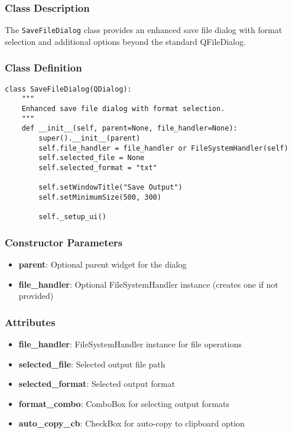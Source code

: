 \subsubsection{Class Description}

The \texttt{SaveFileDialog} class provides an enhanced save file dialog with format selection and additional options beyond the standard QFileDialog.

\subsubsection{Class Definition}

\begin{verbatim}
class SaveFileDialog(QDialog):
    """
    Enhanced save file dialog with format selection.
    """
    def __init__(self, parent=None, file_handler=None):
        super().__init__(parent)
        self.file_handler = file_handler or FileSystemHandler(self)
        self.selected_file = None
        self.selected_format = "txt"
        
        self.setWindowTitle("Save Output")
        self.setMinimumSize(500, 300)
        
        self._setup_ui()
\end{verbatim}

\subsubsection{Constructor Parameters}

\begin{itemize}
    \item \textbf{parent}: Optional parent widget for the dialog
    \item \textbf{file\_handler}: Optional FileSystemHandler instance (creates one if not provided)
\end{itemize}

\subsubsection{Attributes}

\begin{itemize}
    \item \textbf{file\_handler}: FileSystemHandler instance for file operations
    \item \textbf{selected\_file}: Selected output file path
    \item \textbf{selected\_format}: Selected output format
    \item \textbf{format\_combo}: ComboBox for selecting output formats
    \item \textbf{auto\_copy\_cb}: CheckBox for auto-copy to clipboard option
\end{itemize}

